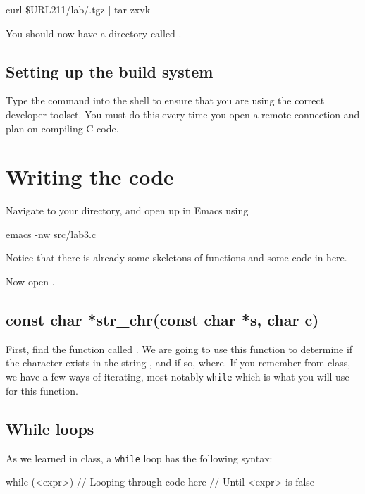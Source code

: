 \documentclass{tufte-handout}
\begin{document}
\begin{CmdLine}
  \prompt curl \$URL211/lab/\ThisLabBase.tgz | tar zxvk
\end{CmdLine}

You should now have a directory called \filename{\ThisLabBase}.

\subsection{Setting up the build system}
Type the  command into the shell to ensure that you are
using the correct developer toolset. You must do this every time you
open a remote connection and plan on compiling C code.

\section{Writing the code}
Navigate to your \filename{\ThisLabBase} directory, and open up
 in Emacs using
\begin{CmdLine}
  \prompt emacs -nw src/lab3.c
\end{CmdLine}

\noindent
Notice that there is already some skeletons of functions and some code in  here.

Now open .

\subsection{{const char *str\_chr(const char *s, char c)}}
First, find the function called
.
We are going to use this function to determine if the character
 exists in the string , and if so, where. If you
remember from class, we have a few ways of iterating, most notably
\texttt{while} which is what you will use for this function.

\subsection{While loops}
As we learned in class, a \texttt{while} loop has the following
syntax:

\begin{Code}
    while (<expr>) {
        // Looping through code here
        // Until <expr> is false
    }
\end{Code}
\end{document}
